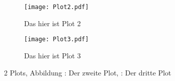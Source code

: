 \begin{figure}
\centering
\begin{subfigure}{0,48\textwidth}
  \centering
  \texttt{[image: Plot2.pdf]}
  \caption{Das hier ist Plot 2}
  \label{fig:Plot2}
\end{subfigure}
\begin{subfigure}{0,48\textwidth}
  \centering
  \texttt{[image: Plot3.pdf]}
  \caption{Das hier ist Plot 3}
  \label{fig:Plot3}
\end{subfigure}
\caption{2 Plots, Abbildung
: Der zweite Plot,
: Der dritte Plot}
\label{fig:Plots}
\end{figure}
